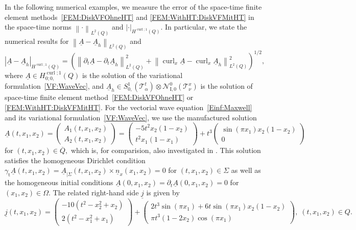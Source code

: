 \documentclass[a4paper,11pt]{article}
\newcommand{\cu}{\operatorname{curl}}
\newcommand{\trt}{\gamma_\mathrm{t}}
\renewcommand{\vec}[1]{\underline{#1}}
\newcommand{\abs}[1]{\left\lvert{#1}\right\rvert}
\newcommand{\norm}[1]{{\left\lVert{#1}\right\rVert}}
\begin{document}
In the following numerical examples, we measure the error of the space-time finite element methods~\eqref{FEM:DiskVFOhneHT} and \eqref{FEM:WithHT:DiskVFMitHT} in the space-time norms $\norm{\cdot}_{L^2(Q)}$ and $\abs{\cdot}_{H^{\cu;1}(Q)}$. In particular, we state the numerical results for $\norm{\vec A - \vec A_h}_{L^2(Q)}$ and
\begin{equation*}
	\abs{\vec A - \vec A_h}_{H^{\cu;1}(Q)} = \left( \norm{\partial_t\vec A - \partial_t \vec A_h}_{L^2(Q)}^2 + \norm{\cu_x \vec A - \cu_x \vec A_h}_{L^2(Q)}^2 \right)^{1/2},
\end{equation*}
where $\vec A \in H^{\cu;1}_{0;0,} (Q)$ is the solution of the variational formulation~\eqref{VF:WaveVec}, and $\vec A_h \in S_{0,}^1(\mathcal T^t_\alpha) \otimes \mathcal N_\mathrm{I,0}^0(\mathcal T^x_\nu)$ is the solution of space-time finite element method~\eqref{FEM:DiskVFOhneHT} or \eqref{FEM:WithHT:DiskVFMitHT}. For the vectorial wave equation~\eqref{Einf:Maxwell} and its variational formulation~\eqref{VF:WaveVec}, we use the manufactured solution
\begin{equation}  \label{Num:Lsg}
	\vec A (t,x_1,x_2) = \begin{pmatrix}
		A_1(t,x_1,x_2) \\
		A_2(t,x_1,x_2)
	\end{pmatrix}
	=
	\begin{pmatrix}
		-5 t^2 x_2 (1-x_2) \\
		t^2 x_1 (1-x_1)
	\end{pmatrix}+ t^3
	\begin{pmatrix}
		\sin(\pi x_1) x_2 (1-x_2) \\
		0
	\end{pmatrix}
\end{equation}
for $(t,x_1,x_2) \in \overline{Q},$ which is, for comparision, also investigated in \cite{HauserOhm2023}. This solution satisfies the homogeneous Dirichlet condition $\trt \vec A (t,x_1,x_2) = \vec A_{|\Sigma}(t,x_1,x_2) \times \vec n_x(x_1,x_2) = 0$ for $(t,x_1,x_2) \in \Sigma$ as well as the homogeneous initial conditions
$\vec A(0,x_1,x_2) = \partial_t \vec A(0,x_1,x_2) = 0$ for $(x_1,x_2) \in \Omega.$
The related right-hand side $\vec j$ is given by
\begin{equation*}
	\vec j(t,x_1,x_2) = \begin{pmatrix}
		-10 (t^2-x_2^2+x_2)  \\
		2 (t^2-x_1^2+x_1)
	\end{pmatrix}
	+
	\begin{pmatrix}
		2t^3\sin(\pi x_1) +6t\sin(\pi x_1) x_2 (1-x_2) \\
		\pi t^3(1-2x_2)\cos(\pi x_1)
	\end{pmatrix}, \; (t,x_1,x_2) \in Q.
\end{equation*}
\end{document}
